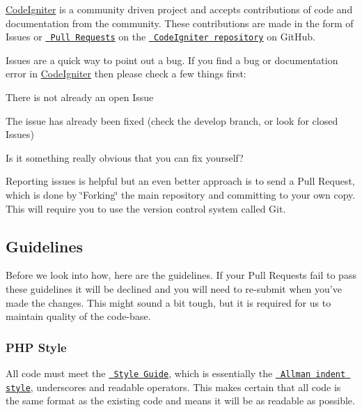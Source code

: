\mbox{\hyperlink{a00009}{Code\+Igniter}} is a community driven project and accepts contributions of code and documentation from the community. These contributions are made in the form of Issues or \href{http://help.github.com/send-pull-requests/}{\texttt{ Pull Requests}} on the \href{https://github.com/bcit-ci/CodeIgniter}{\texttt{ Code\+Igniter repository}} on Git\+Hub.

Issues are a quick way to point out a bug. If you find a bug or documentation error in \mbox{\hyperlink{a00009}{Code\+Igniter}} then please check a few things first\+:


\begin{DoxyEnumerate}
\item There is not already an open Issue
\item The issue has already been fixed (check the develop branch, or look for closed Issues)
\item Is it something really obvious that you can fix yourself?
\end{DoxyEnumerate}

Reporting issues is helpful but an even better approach is to send a Pull Request, which is done by \char`\"{}\+Forking\char`\"{} the main repository and committing to your own copy. This will require you to use the version control system called Git.

\subsection*{Guidelines}

Before we look into how, here are the guidelines. If your Pull Requests fail to pass these guidelines it will be declined and you will need to re-\/submit when you’ve made the changes. This might sound a bit tough, but it is required for us to maintain quality of the code-\/base.

\subsubsection*{P\+HP Style}

All code must meet the \href{https://codeigniter.com/user_guide/general/styleguide.html}{\texttt{ Style Guide}}, which is essentially the \href{https://en.wikipedia.org/wiki/Indent_style\#Allman_style}{\texttt{ Allman indent style}}, underscores and readable operators. This makes certain that all code is the same format as the existing code and means it will be as readable as possible.

